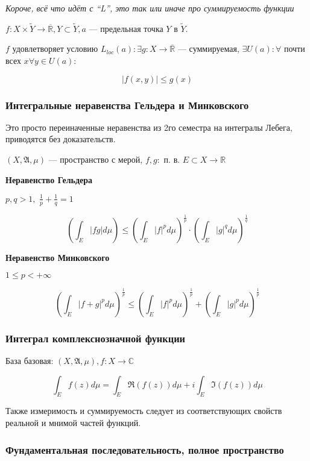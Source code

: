 \documentclass{article}
\def\dbl{\,\,}
\def\rinf{\overline{\mathbb{R}}}
\begin{document}
\textit{Короче, всё что идёт с ``L'', это так или иначе про суммируемость функции}

$f: X \times \tilde{Y} \rightarrow \rinf, Y \subset \tilde{Y}, a$ --- предельная точка $Y$ в $\tilde{Y}$. 

$f$ удовлетворяет условию $L_{loc}(a): \exists g: X \rightarrow \rinf$ --- суммируемая, $\exists U(a): \forall$ почти всех $x \forall y \in U(a)$:

\[|f(x, y)| \le g(x)\]

\subsubsection{Интегральные неравенства Гельдера и Минковского}

Это просто переиначенные неравенства из 2го семестра на интегралы Лебега, приводятся без доказательств.

$(X, \mathfrak{A}, \mu)$ --- пространство с мерой, $f, g: $ п. в. $E \subset X \rightarrow \mathbb{R}$

\textbf{Неравенство Гельдера}

$p, q > 1, \dbl \frac{1}{p} + \frac{1}{q} = 1$

\[\left(\int_{E} |fg| d\mu \right) \le \left(\int_{E} |f|^p d\mu\right)^{\frac{1}{p}} \cdot \left(\int_{E} |g|^q d\mu\right)^{\frac{1}{q}}\]

\textbf{Неравенство Минковского}

$1 \le p < + \infty$

\[\left(\int_{E} |f + g|^p d\mu \right)^{\frac{1}{p}} \le \left(\int_{E} |f|^p d\mu\right)^{\frac{1}{p}} + \left(\int_{E} |g|^p d\mu\right)^{\frac{1}{p}}\]

\subsubsection{Интеграл комплекснозначной функции}

База базовая: $(X, \mathfrak{A}, \mu), f: X \rightarrow \mathbb{C}$

\[\int_{E}f(z)d\mu = \int_{E}\Re(f(z))d\mu + i\int_{E}\Im(f(z))d\mu\]

Также измеримость и суммируемость следует из соответствующих свойств реальной и мнимой частей функций.

\subsubsection{Фундаментальная последовательность, полное пространство}
\end{document}

